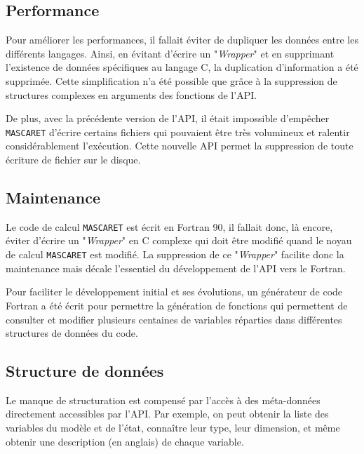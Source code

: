 \documentclass[a4paper,11pt]{article}
\begin{document}
\subsection{Performance}

 Pour am\'eliorer les performances, il fallait \'eviter de dupliquer les donn\'ees entre les diff\'erents langages. Ainsi, en \'evitant d'\'ecrire un "\textit{Wrapper}" et en supprimant l'existence de donn\'ees sp\'ecifiques au langage C, la duplication d'information a \'et\'e supprim\'ee. Cette simplification n'a \'et\'e possible que gr\^ace \`a la suppression de structures complexes en arguments des fonctions de l'API.
 
 \vspace{0.5cm}
 
 De plus, avec la pr\'ec\'edente version de l'API, il \'etait impossible d'emp\^echer \texttt{MASCARET} d'\'ecrire certains fichiers qui pouvaient \^etre tr\`es volumineux et ralentir consid\'erablement l'ex\'ecution. Cette nouvelle API permet la suppression de toute \'ecriture de fichier sur le disque.

\subsection{Maintenance}

 Le code de calcul \texttt{MASCARET} est \'ecrit en Fortran 90, il fallait donc, l\`a encore, \'eviter d'\'ecrire un "\textit{Wrapper}" en C complexe qui doit \^etre modifi\'e quand le noyau de calcul \texttt{MASCARET} est modifi\'e. La suppression de ce "\textit{Wrapper}" facilite donc la maintenance mais d\'ecale l'essentiel du d\'eveloppement de l'API vers le Fortran.
 
 \vspace{0.5cm}
 
 Pour faciliter le d\'eveloppement initial et ses \'evolutions, un g\'en\'erateur de code Fortran a \'et\'e \'ecrit pour permettre la g\'en\'eration de fonctions qui permettent de consulter et modifier plusieurs centaines de variables r\'eparties dans diff\'erentes structures de donn\'ees du code.

\subsection{Structure de donn\'ees}

 Le manque de structuration est compens\'e par l'acc\`es \`a des m\'eta-donn\'ees directement accessibles par l'API. Par exemple, on peut obtenir la liste des variables du mod\`ele et de l'\'etat, conna\^itre leur type, leur dimension, et m\^eme obtenir une description (en anglais) de chaque variable.
\end{document}
